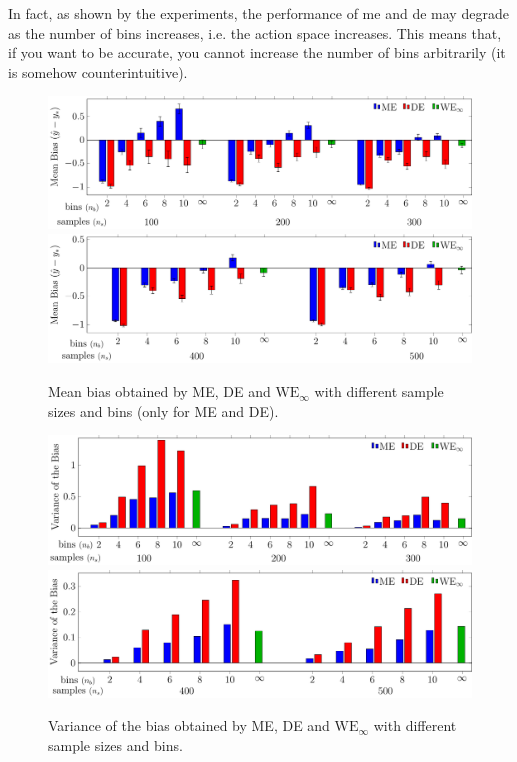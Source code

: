 In fact, as shown by the experiments, the performance of \gls{me} and \gls{de} may degrade as the number of bins increases, i.e. the action space increases.
This means that, if you want to be accurate, you cannot increase the number of bins arbitrarily (it is somehow counterintuitive).
\begin{figure}
 \begin{minipage}{.99\columnwidth}
 \centering
  \includegraphics[width=\textwidth]{./img/MM_123_new_noabs.pdf}\\
  \includegraphics[width=\textwidth]{./img/MM_45_new_noabs.pdf}
 \end{minipage}
  \caption[Bias in pricing problem]{Mean bias obtained by ME, DE and $\text{WE}_{\infty}$ with different sample sizes  and bins (only for ME and DE).
  }
  \label{F:pricing_bias}
\end{figure}
\begin{figure}[t]
 \begin{minipage}{.99\columnwidth}
 \centering
  \includegraphics[width=\textwidth]{./img/MM_123_new_var.pdf}\\
  \includegraphics[width=\textwidth]{./img/MM_45_new_var.pdf}
 \end{minipage}
  \caption[Variance in pricing problem]{Variance of the bias obtained by ME, DE and $\text{WE}_{\infty}$ with different sample sizes and bins.
  }
  \label{F:pricing_variance}
\end{figure}
